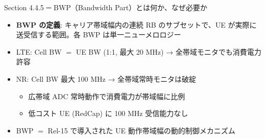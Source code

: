 \begin{frame}{Section 4.4.5 ─ BWP（Bandwidth Part）とは何か、なぜ必要か}
\begin{itemize}
  \item \textbf{BWP の定義}: キャリア帯域幅内の連続 RB のサブセットで、UE が実際に送受信する範囲。各 BWP は単一ニューメロロジー
  \item LTE: Cell BW $=$ UE BW (1:1, 最大 20 MHz) → 全帯域モニタでも消費電力許容
  \item NR: Cell BW 最大 100 MHz → 全帯域常時モニタは破綻
    \begin{itemize}
      \item 広帯域 ADC 常時動作で消費電力が帯域幅に比例
      \item 低コスト UE (RedCap) に 100 MHz 受信能力なし
    \end{itemize}
  \item BWP $=$ Rel-15 で導入された UE 動作帯域幅の動的制御メカニズム
\end{itemize}
\end{frame}
